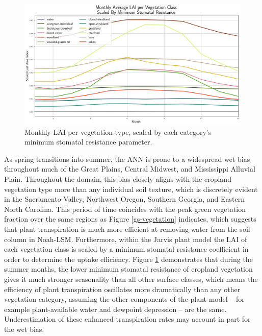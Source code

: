 \begin{figure}[h!]
    \centering

    \includegraphics[width=.99\linewidth,draft=false]{figures/gvf/lai-scaled_monthly_stats.png}

    \caption{Monthly LAI per vegetation type, scaled by each category's minimum stomatal resistance parameter.}
    \label{veg-lai-scaled}
\end{figure}

As spring transitions into summer, the ANN is prone to a widespread wet bias throughout much of the Great Plains, Central Midwest, and Mississippi Alluvial Plain. Throughout the domain, this bias closely aligns with the cropland vegetation type more than any individual soil texture, which is discretely evident in the Sacramento Valley, Northwest Oregon, Southern Georgia, and Eastern North Carolina. This period of time coincides with the peak green vegetation fraction over the same regions as Figure \ref{gs-vegetation} indicates, which suggests that plant transpiration is much more efficient at removing water from the soil column in Noah-LSM. Furthermore, within the Jarvis plant model the LAI of each vegetation class is scaled by a minimum stomatal resistance coefficient in order to determine the uptake efficiency. Figure \ref{veg-lai-scaled} demonstrates that during the summer months, the lower minimum stomatal resistance of cropland vegetation gives it much stronger seasonality than all other surface classes, which means the efficiency of plant transpiration oscillates more dramatically than any other vegetation category, assuming the other components of the plant model -- for example plant-available water and dewpoint depression -- are the same. Underestimation of these enhanced transpiration rates may account in part for the wet bias.

